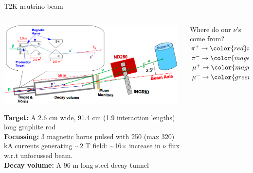 %
%
\begin{frame}{T2K neutrino beam}
\begin{columns}
  \begin{column}{0.78\textwidth}
   \begin{center}
    \includegraphics[width=0.99\textwidth]{./images/3nu/accelerator/t2k/neutrino_beamline_schematic.png}\\
   \end{center}
   \vspace{0.4cm}
   {\scriptsize
     {\bf Target:} A 2.6 cm wide, 91.4 cm (1.9 interaction lengths) long graphite rod \\
     {\bf Focussing:}
       3 magnetic horns pulsed with 250 (max 320) kA currents generating $\sim$2 T field:
       $\sim$16$\times$ increase in $\nu$ flux w.r.t unfocussed beam.\\
     {\bf Decay volume:} A 96 m long steel decay tunnel\\
   }
  \end{column}
  \begin{column}{0.22\textwidth}
   \begin{block}{}
   {\scriptsize
    Where do our $\nu$'s come from?\\
    \vspace{0.3cm}
    $\pi^{+} \rightarrow {\color{red}\nu_{\mu}} + \mu^{+}$\\
    $\pi^{-} \rightarrow {\color{magenta}\bar{\nu}_{\mu}} + \mu^{-}$\\
    $\mu^{+} \rightarrow {\color{magenta}\bar{\nu}_{\mu}} + {\color{blue}\nu_{e}} + e^{+}$\\
    $\mu^{-} \rightarrow {\color{green}\bar{\nu}_{e}} + {\color{red}\nu_{\mu}} + e^{-}$\\
}
\end{block}
\end{column}
\end{columns}
\end{frame}

